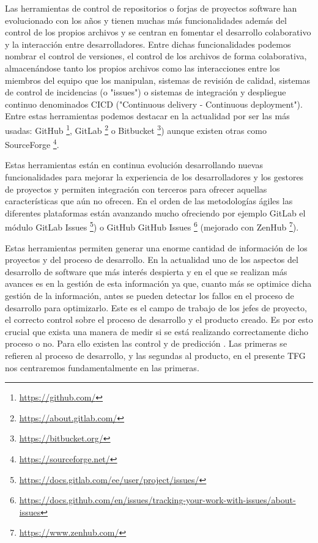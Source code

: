 Las herramientas de control de repositorios o forjas de proyectos software han evolucionado con los años y tienen muchas más funcionalidades además del control de los propios archivos y se centran en fomentar el desarrollo colaborativo y la interacción entre desarrolladores.
Entre dichas funcionalidades podemos nombrar el control de versiones, el control de los archivos de forma colaborativa, almacenándose tanto los propios archivos como las interacciones entre los miembros del equipo que los manipulan, sistemas de revisión de calidad, sistemas de control de incidencias (o "issues") o sistemas de integración y despliegue continuo denominados CICD ("Continuous delivery - Continuous deployment").
Entre estas herramientas podemos destacar en la actualidad por ser las más usadas:  GitHub \footnote{\url{https://github.com/}}, GitLab \footnote{\url{https://about.gitlab.com/}} o Bitbucket  \footnote{\url{https://bitbucket.org/}}) aunque existen otras como SourceForge \footnote{\url{https://sourceforge.net/}}.

Estas herramientas están en continua evolución desarrollando nuevas funcionalidades para mejorar la experiencia de los desarrolladores y los gestores de proyectos y permiten integración con terceros para ofrecer aquellas características que aún no ofrecen.
En el orden de las metodologías ágiles las diferentes plataformas están avanzando mucho ofreciendo por ejemplo GitLab el módulo GitLab Issues 
\footnote{\url{https://docs.gitlab.com/ee/user/project/issues/}}) o  
GitHub GitHub Issues \footnote{\url{https://docs.github.com/en/issues/tracking-your-work-with-issues/about-issues}} (mejorado con ZenHub \footnote{\url{https://www.zenhub.com/}}).

Estas herramientas permiten generar una enorme cantidad de información de los proyectos y del proceso de desarrollo. En la actualidad uno de los aspectos del desarrollo de software que más interés despierta y en el que se realizan más avances es en la gestión de esta información ya que, cuanto más se optimice dicha gestión de la información, antes se pueden detectar los fallos en el proceso de desarrollo para optimizarlo.
Este es el campo de trabajo de los jefes de proyecto, el correcto control sobre el proceso de desarrollo y el producto creado. Es por esto crucial que exista una manera de medir si se está realizando correctamente dicho proceso o no.
Para ello existen las control y de predicción \cite{sommerville_ingenierisoftware_2002}. Las primeras se refieren al proceso de desarrollo, y las segundas al producto, en el presente TFG nos centraremos fundamentalmente en las primeras.

